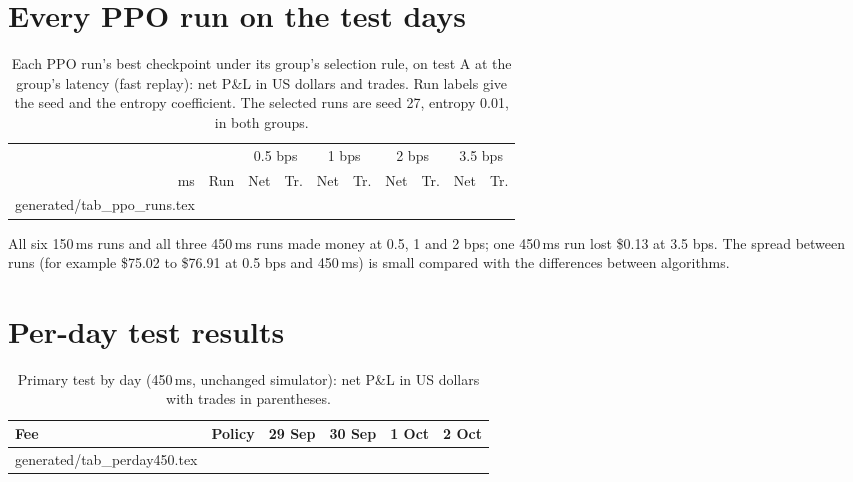\documentclass[12pt,a4paper]{article}
\makeatletter
\DeclareRobustCommand{\bps}{\ifmmode\,\text{bps}\else\,bps\fi}
\newcommand{\usd}[1]{\$#1}
\newcommand{\tabinput}[1]{\@@input #1 }
\makeatother
\begin{document}
\section{Every PPO run on the test days}\label{app:runs}
\begin{table}[H]
\centering
\caption{Each PPO run's best checkpoint under its group's selection rule, on test A at the
group's latency (fast replay): net P\&L in US dollars and trades. Run labels give the seed and
the entropy coefficient. The selected runs are seed 27, entropy 0.01, in both groups.}
\label{tab:ppo_runs}
\small
\setlength{\tabcolsep}{4pt}
\begin{tabular}{@{}rlrrrrrrrr@{}}
\toprule
 & & \multicolumn{2}{c}{0.5\bps} & \multicolumn{2}{c}{1\bps} & \multicolumn{2}{c}{2\bps} & \multicolumn{2}{c}{3.5\bps} \\
\cmidrule(lr){3-4}\cmidrule(lr){5-6}\cmidrule(lr){7-8}\cmidrule(l){9-10}
ms & Run & Net & Tr. & Net & Tr. & Net & Tr. & Net & Tr. \\
\midrule
\tabinput{generated/tab_ppo_runs.tex}
\bottomrule
\end{tabular}
\end{table}
All six 150\,ms runs and all three 450\,ms runs made money at 0.5, 1 and 2\bps; one 450\,ms
run lost \usd{0.13} at 3.5\bps. The spread between runs (for example \usd{75.02} to \usd{76.91}
at 0.5\bps{} and 450\,ms) is small compared with the differences between algorithms.

\section{Per-day test results}\label{app:perday}
\begin{table}[H]
\centering
\caption{Primary test by day (450\,ms, unchanged simulator): net P\&L in US dollars with trades
in parentheses.}
\label{tab:perday}
\small
\setlength{\tabcolsep}{4pt}
\begin{tabular}{@{}llrrrr@{}}
\toprule
Fee & Policy & 29 Sep & 30 Sep & 1 Oct & 2 Oct \\
\midrule
\tabinput{generated/tab_perday450.tex}
\bottomrule
\end{tabular}
\end{table}
\end{document}

